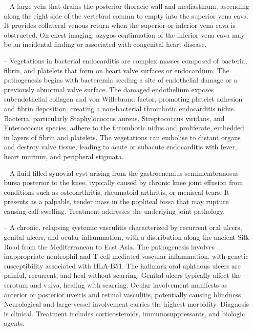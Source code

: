 -- A large vein that drains the posterior thoracic wall and mediastinum, ascending along the right side of the vertebral column to empty into the superior vena cava. It provides collateral venous return when the superior or inferior vena cava is obstructed. On chest imaging, azygos continuation of the inferior vena cava may be an incidental finding or associated with congenital heart disease.

-- Vegetations in bacterial endocarditis are complex masses composed of bacteria, fibrin, and platelets that form on heart valve surfaces or endocardium. The pathogenesis begins with bacteremia seeding a site of endothelial damage or a previously abnormal valve surface. The damaged endothelium exposes subendothelial collagen and von Willebrand factor, promoting platelet adhesion and fibrin deposition, creating a non-bacterial thrombotic endocarditis nidus. Bacteria, particularly Staphylococcus aureus, Streptococcus viridans, and Enterococcus species, adhere to the thrombotic nidus and proliferate, embedded in layers of fibrin and platelets. The vegetations can embolise to distant organs and destroy valve tissue, leading to acute or subacute endocarditis with fever, heart murmur, and peripheral stigmata.

-- A fluid-filled synovial cyst arising from the gastrocnemius-semimembranosus bursa posterior to the knee, typically caused by chronic knee joint effusion from conditions such as osteoarthritis, rheumatoid arthritis, or meniscal tears. It presents as a palpable, tender mass in the popliteal fossa that may rupture causing calf swelling. Treatment addresses the underlying joint pathology.

-- A chronic, relapsing systemic vasculitis characterized by recurrent oral ulcers, genital ulcers, and ocular inflammation, with a distribution along the ancient Silk Road from the Mediterranean to East Asia. The pathogenesis involves inappropriate neutrophil and T-cell mediated vascular inflammation, with genetic susceptibility associated with HLA-B51. The hallmark oral aphthous ulcers are painful, recurrent, and heal without scarring. Genital ulcers typically affect the scrotum and vulva, healing with scarring. Ocular involvement manifests as anterior or posterior uveitis and retinal vasculitis, potentially causing blindness. Neurological and large-vessel involvement carries the highest morbidity. Diagnosis is clinical. Treatment includes corticosteroids, immunosuppressants, and biologic agents.

